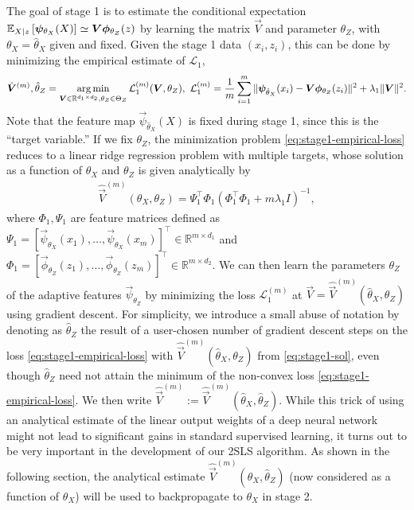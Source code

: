 The goal of stage 1 is to estimate the conditional expectation $\expect[X|z]{\vec{\psi
}_{\theta_X}(X)} \simeq \vec{V} \vec{\phi}_{\theta_Z}(z)$ by learning the matrix $\vec{V}$ and parameter $\theta_Z$, with $\theta_X=\hat{\theta}_X$ given and fixed. Given the stage 1 data $(x_i, z_i)$, this can be done by minimizing the empirical estimate of $\mathcal{L}_1$,
\begin{align}
    \hat{\vec{V}}^{(m)}, \hat{\theta}_Z = \argmin_{\vec{V} \in \mathbb{R}^{d_1\times d_2}, \theta_Z \in \Theta_Z} \mathcal{L}_1^{(m)}(\vec{V}, \theta_Z),~ \mathcal{L}_1^{(m)} = \frac1m \sum_{i=1}^m \|\vec{\psi}_{\hat\theta_X}(x_i) - \vec{V}\vec{\phi}_{\theta_Z}(z_i)\|^2 + \lambda_1 \|\vec{V}\|^2. \label{eq:stage1-empirical-loss}
\end{align}
Note that the feature map $\vec{\psi}_{\hat\theta_X}(X)$ is fixed during stage 1, since this is the ``target variable.'' 
If we fix $\theta_Z$, the minimization problem \eqref{eq:stage1-empirical-loss} reduces to a  linear ridge regression problem with multiple targets, whose solution as a function of $\theta_X$ and $\theta_Z$ is given analytically by
\begin{align}
    \hat{\vec{V}}^{(m)}(\theta_X, \theta_Z) = \Psi_1^\top \Phi_1 (\Phi_1^\top \Phi_1 + m\lambda_1 I)^{-1}, \label{eq:stage1-sol}
\end{align}
where $\Phi_1, \Psi_1$ are feature matrices defined as
$
    \Psi_1 = [\vec{\psi}_{\theta_X}(x_1), \dots, \vec{\psi}_{\theta_X}(x_m)]^\top \in \mathbb{R}^{m \times d_1}$ and $
    \Phi_1 = [\vec{\phi}_{\theta_Z}(z_1), \dots, \vec{\phi}_{\theta_Z}(z_m)]^\top \in \mathbb{R}^{m \times d_2}.
$
We can then learn the parameters $\theta_Z$ of the adaptive features $\vec{\psi}_{\theta_Z}$ by minimizing the loss $\mathcal{L}^{(m)}_1$ at $\vec{V} = \hat{\vec{V}}^{(m)}(\hat\theta_X, \theta_Z)$ using gradient descent.
For simplicity, we introduce a small abuse of notation by denoting as $\hat{\theta}_Z$ the result of a user-chosen number of gradient descent steps on the loss \eqref{eq:stage1-empirical-loss} with $\hat{\vec{V}}^{(m)}(\hat\theta_X, \theta_Z)$ from \eqref{eq:stage1-sol}, even though $\hat{\theta}_Z$ need not attain the minimum of the non-convex loss \eqref{eq:stage1-empirical-loss}. We then write $ \hat{\vec{V}}^{(m)}:=\hat{\vec{V}}^{(m)}(\hat\theta_X, \hat{\theta}_Z)$.
While this trick of using an analytical estimate of the linear output weights of a deep neural network might not lead to significant gains in standard supervised learning, it turns out to be very important in the development of our 2SLS algorithm. As shown in the following section, the analytical estimate $\hat{\vec{V}}^{(m)}(\theta_X,\hat{\theta}_Z)$ (now considered as a function of $\theta_X$) will be used to backpropagate to $\theta_X$ in stage 2. 
